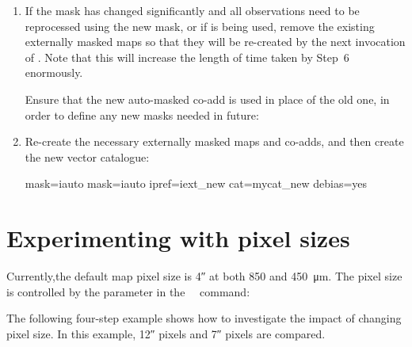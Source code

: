 \begin{enumerate}
\item If the mask has changed significantly and all observations need
  to be reprocessed using the new mask, or if  is being used,
  remove the existing externally masked maps so that they will be re-created by
  the next invocation of \poltwomap.  Note that this will increase the length of
  time taken by Step~6 enormously.

  Ensure that the new auto-masked co-add is used in place of the old one, in order to
  define any new masks needed in future:

\begin{terminalv}
\end{terminalv}

\item Re-create the necessary externally masked maps and co-adds, and
  then create the new vector catalogue:

\begin{terminalv}
     mask=iauto
     mask=iauto ipref=iext_new cat=mycat_new debias=yes
\end{terminalv}
\end{enumerate}


\section{Experimenting with pixel sizes}

Currently,the default map pixel size is 4\si{\arcsecond} at both
850 and \SI{450}{\micro\metre}. The pixel size is controlled by the
 parameter in the \smurf\ \poltwomap\ command:

\begin{terminalv}
\end{terminalv}


The following four-step example shows how to investigate the impact of
changing pixel size.  In this example, 12\si{\arcsecond}
pixels and 7\si{\arcsecond} pixels are compared.

